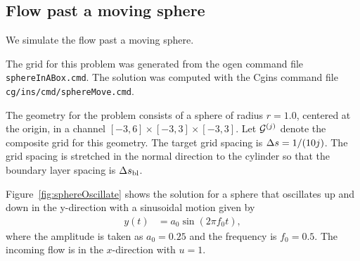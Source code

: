 \clearpage
\subsection{Flow past a moving sphere}\label{sec:movingSphere}


We simulate the flow past a moving sphere.

The grid for this problem was generated from the ogen command file {\tt sphereInABox.cmd}.
The solution was computed with the Cgins command file {\tt cg/ins/cmd/sphereMove.cmd}.

The geometry for the problem consists of a sphere of radius $r=1.0$, centered at the 
origin, in a channel $[-3,6]\times[-3,3]\times[-3,3]$. 
Let ${\mathcal G}^{(j)}$ denote the composite grid for this geometry. The target grid spacing is $\Delta s=1/(10 j)$.
The grid spacing is stretched in the normal direction to the cylinder so that the boundary layer
spacing is $\Delta s_{\rm bl}$. 




Figure~\ref{fig:sphereOscillate} shows the solution for a sphere that oscillates up and down
in the y-direction with a sinusoidal motion given by 
\begin{align*}
   y(t) &= a_0 \sin( 2\pi f_0 t) ,
\end{align*}
where the amplitude is taken as $a_0=0.25$ and the frequency is $f_0=0.5$.
The incoming flow is in the $x$-direction with $u=1$.


